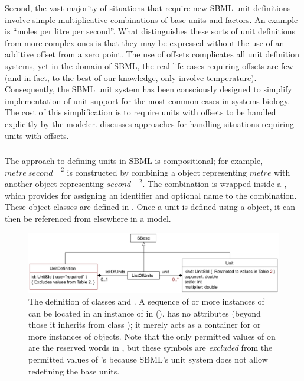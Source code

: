 Second, the vast majority of situations that require new SBML unit
definitions involve simple multiplicative combinations of base
units and factors.  An example is ``moles per litre per second''.
What distinguishes these sorts of unit definitions from more
complex ones is that they may be expressed without the use of an
additive offset from a zero point.  The use of offsets complicates
all unit definition systems, yet in the domain of SBML, the
real-life cases requiring offsets are few (and in fact, to the
best of our knowledge, only involve temperature).  Consequently,
the SBML unit system has been consciously designed to simplify
implementation of unit support for the most common cases in
systems biology.  The cost of this simplification is to require
units with offsets to be handled explicitly by the modeler.
 discusses approaches
for handling situations requiring units with offsets.


\subsubsection{}
\label{sec:unitdefinition-structure}

The approach to defining units in SBML is compositional; for
example, $metre\ second^{\,-2}$ is constructed by combining a
\Unit object representing $metre$ with another \Unit object
representing $second^{\,-2}$.  The combination is wrapped inside a
\UnitDefinition, which provides for assigning an identifier and
optional name to the combination.  These object classes are
defined in .  Once a unit is
defined using a \UnitDefinition object, it can then be referenced
from elsewhere in a model.

\begin{figure}[htb]
  \centering
  \vspace*{1.5ex}
  \includegraphics[scale=0.78]{figs/unitdefinition-uml}
  \vspace*{0.5ex}
  \caption{The definition of classes \UnitDefinition and
      \Unit.  A sequence of  or more instances of
      \UnitDefinition can be located in an instance of
      \ListOfUnitDefinitions in \Model
      (\protect{}).  \ListOfUnits has
      no attributes (beyond those it inherits from class \SBaseUpright);
      it merely acts as a container for  or more instances of
      \Unit objects.  Note that the only permitted values of
       on \Unit are the reserved words in
      , but these symbols are
      \emph{excluded} from the permitted values of
      \UnitDefinition's  because SBML's unit system does
      not allow redefining the base units.}
  \label{fig:unitdefinition}
\end{figure}


